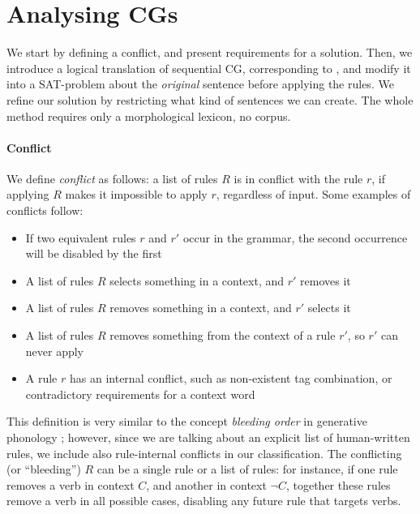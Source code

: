 \section{Analysing CGs}
\label{sec:sectionCGana}

We start by defining a conflict, and present requirements for a solution.
Then, we introduce a logical translation of sequential CG, corresponding to \cite{lager_nivre01}, and modify it into a SAT-problem about the \emph{original} sentence before applying the rules.
We refine our solution by restricting what kind of sentences we can create.
The whole method requires only a morphological lexicon, no corpus. 

\paragraph{Conflict}

We define \emph{conflict} as follows: a list of rules $R$ is in conflict with the rule $r$, if applying $R$ makes it impossible to apply $r$, regardless of input. 
Some examples of conflicts follow:

\begin{itemize}
\item If two equivalent rules $r$ and $r'$ occur in the grammar, the second occurrence will be disabled by the first
\item A list of rules $R$ selects something in a context, and $r'$ removes it
\item A list of rules $R$ removes something in a context, and $r'$ selects it
\item A list of rules $R$ removes something from the context of a rule $r'$, so $r'$ can never apply
\item A rule $r$ has an internal conflict, such as non-existent
tag combination, or contradictory requirements for a context word
\end{itemize}

This definition is very similar to the concept \emph{bleeding order} in generative phonology \cite{kiparsky1968}; however, since we are talking about an explicit list of 
human-written rules, we include also rule-internal conflicts in our classification.
The conflicting (or ``bleeding'') $R$ can be a single rule or a list of rules: for instance, if one rule removes a verb in
context $C$, and another in context $\neg C$, together these rules
remove a verb in all possible cases, disabling any future rule that
targets verbs.

